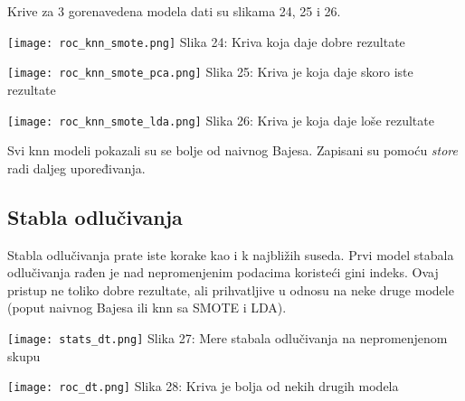 \documentclass[a4paper]{article}
\begin{document}
{Krive za 3 gorenavedena modela dati su slikama 24, 25 i 26.\\

\noindent\begin{minipage}{0.35\textwidth}
\texttt{[image: roc\_knn\_smote.png]}
\hphantom{}Slika 24: Kriva koja daje dobre rezultate\\
\end{minipage}
\noindent\begin{minipage}{0.01\textwidth}
\hphantom{a}
\end{minipage}
\begin{minipage}{0.35\textwidth}
\texttt{[image: roc\_knn\_smote\_pca.png]}
\hphantom{}Slika 25: Kriva je koja daje skoro iste rezultate\\
\end{minipage}
\noindent\begin{minipage}{0.01\textwidth}
\hphantom{a}
\end{minipage}
\begin{minipage}{0.35\textwidth}
\texttt{[image: roc\_knn\_smote\_lda.png]}
\hphantom{}Slika 26: Kriva je koja daje loše rezultate\\
\end{minipage}

Svi knn modeli pokazali su se bolje od naivnog Bajesa. Zapisani su pomoću {\em store} radi daljeg upoređivanja.

\subsection{Stabla odlučivanja}
\label{dt}

Stabla odlučivanja prate iste korake kao i k najbližih suseda. Prvi model stabala odlučivanja rađen je nad nepromenjenim podacima koristeći gini indeks. Ovaj pristup ne toliko dobre rezultate, ali prihvatljive u odnosu na neke druge modele (poput naivnog Bajesa ili knn sa SMOTE i LDA).

\noindent\begin{minipage}{0.4\textwidth}
\texttt{[image: stats\_dt.png]}
Slika 27: Mere stabala odlučivanja na nepromenjenom skupu\\
\end{minipage}
\begin{minipage}{0.6\textwidth}
\texttt{[image: roc\_dt.png]}
\hphantom{aa}Slika 28: Kriva je bolja od nekih drugih modela\\
\end{minipage}

}
\end{document}
